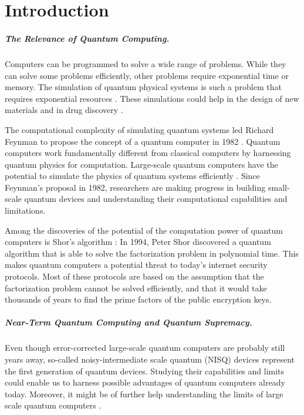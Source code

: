\chapter{Introduction}

\paragraph{The Relevance of Quantum Computing.}
Computers can be programmed to solve a wide range of problems.
While they can solve some problems efficiently, 
other problems require exponential time or memory. The simulation 
of quantum physical systems is such a problem that requires 
exponential resources \cite{nielsen2002quantum}.  
These simulations could help in the design 
of new materials and in drug discovery \cite{8585034}.

The computational complexity of simulating quantum systems led 
Richard Feynman to propose the concept of a quantum computer in 1982 \cite{feynman1982simulating}. 
Quantum computers work fundamentally different from classical computers by 
harnessing quantum physics for computation. Large-scale quantum computers have the potential
to simulate the physics of quantum systems efficiently \cite{Zalka_1998}.
Since Feynman's proposal in 1982, researchers are making progress in building small-scale 
quantum devices and understanding their computational capabilities and limitations.

Among the discoveries of the potential of the computation power of quantum computers is Shor's algorithm \cite{shor1997factorisation}: 
In 1994, Peter Shor discovered a quantum algorithm that is able to solve the 
factorization problem in polynomial time. This makes quantum computers a potential threat to 
today's internet security protocols. Most of these protocols are based on the assumption 
that the factorization problem cannot be solved efficiently, and that it would take thousands of years to find the 
prime factors of the public encryption keys.

\paragraph{Near-Term Quantum Computing and Quantum Supremacy.}
Even though error-corrected large-scale quantum computers are probably still 
years away, so-called noisy-intermediate scale 
quantum (NISQ) devices represent the first generation of quantum devices.
Studying their capabilities and limits could enable us to harness possible advantages 
of quantum computers already today. Moreover, it might be of further help understanding
the limits of large scale quantum computers \cite{Preskill_2018}.

